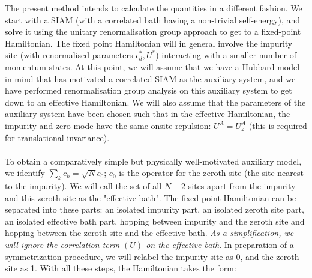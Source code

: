 \documentclass{article}
\numberwithin{equation}{section}
\begin{document}
The present method intends to calculate the quantities in a different fashion.
We start with a SIAM (with a correlated bath having a non-trivial self-energy), and solve it using the unitary renormalisation group approach to get to a fixed-point Hamiltonian.
The fixed point Hamiltonian will in general involve the impurity site (with renormalised parameters $\epsilon_d^*, U^*$) interacting with a smaller number of momentum states.
At this point, we will assume that we have a Hubbard model in mind that has motivated a correlated SIAM as the auxiliary system, and we have performed renormalisation group analysis on this auxiliary system to get down to an effective Hamiltonian. We will also assume that the parameters of the auxiliary system have been chosen such that in the effective Hamiltonian, the impurity and zero mode have the same onsite repulsion: $U^A = U^A_z$ (this is required for translational invariance).
\\\\
To obtain a comparatively simple but physically well-motivated auxiliary model, we identify $\sum_k c_k = \sqrt N c_0$; \(c_0\) is the operator for the zeroth site (the site nearest to the impurity). We will call the set of all \(N-2\) sites apart from the impurity and this zeroth site as the "effective bath". The fixed point Hamiltonian can be separated into these parts: an isolated impurity part, an isolated zeroth site part, an isolated effective bath part, hopping between impurity and the zeroth site and hopping between the zeroth site and the effective bath. \textit{As a simplification, we will ignore the correlation term \((U)\) on the effective bath}. In preparation of a symmetrization procedure, we will relabel the impurity site as 0, and the zeroth site as 1. With all these steps, the Hamiltonian takes the form:
\end{document}
